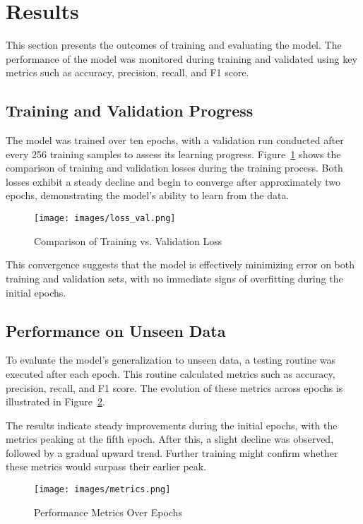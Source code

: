 \section{Results}
\label{sec:results}
This section presents the outcomes of training and evaluating the model. The performance of the model was monitored during training and validated using key metrics such as accuracy, precision, recall, and F1 score.

\subsection{Training and Validation Progress}
The model was trained over ten epochs, with a validation run conducted after every 256 training samples to assess its learning progress. Figure~\ref{fig:loss_val} shows the comparison of training and validation losses during the training process. Both losses exhibit a steady decline and begin to converge after approximately two epochs, demonstrating the model's ability to learn from the data.

\begin{figure}[h]
    \centering
    \texttt{[image: images/loss\_val.png]}
    \caption{Comparison of Training vs. Validation Loss}
    \label{fig:loss_val}
\end{figure}

This convergence suggests that the model is effectively minimizing error on both training and validation sets, with no immediate signs of overfitting during the initial epochs.

\subsection{Performance on Unseen Data}
To evaluate the model's generalization to unseen data, a testing routine was executed after each epoch. This routine calculated metrics such as accuracy, precision, recall, and F1 score. The evolution of these metrics across epochs is illustrated in Figure~\ref{fig:metrics}. 

The results indicate steady improvements during the initial epochs, with the metrics peaking at the fifth epoch. After this, a slight decline was observed, followed by a gradual upward trend. Further training might confirm whether these metrics would surpass their earlier peak.

\begin{figure}[h]
    \centering
    \texttt{[image: images/metrics.png]}
    \caption{Performance Metrics Over Epochs}
    \label{fig:metrics}
\end{figure}

